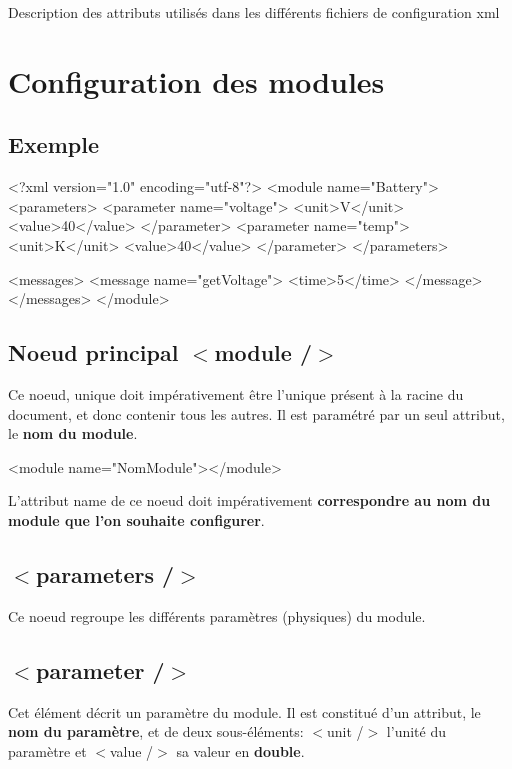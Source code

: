 Description des attributs utilisés dans les différents fichiers de configuration xml\hypertarget{xmlRef_xml_mod}{}\section{Configuration des modules}\label{xmlRef_xml_mod}
\hypertarget{xmlRef_xml_mod_exemple}{}\subsection{Exemple}\label{xmlRef_xml_mod_exemple}

\begin{DoxyCode}
<?xml version=\textcolor{stringliteral}{"1.0"} encoding=\textcolor{stringliteral}{"utf-8"}?>
<module name=\textcolor{stringliteral}{"Battery"}>
    <parameters>
        <parameter name=\textcolor{stringliteral}{"voltage"}>
            <unit>V</unit>
            <value>40</value>
        </parameter>
        <parameter name=\textcolor{stringliteral}{"temp"}>
            <unit>K</unit>
            <value>40</value>
        </parameter>
    </parameters>

    <messages>
        <message name=\textcolor{stringliteral}{"getVoltage"}>
            <time>5</time>
        </message>
    </messages>
</module>
\end{DoxyCode}
\hypertarget{xmlRef_xml_mod_mod}{}\subsection{Noeud principal $<$module /$>$}\label{xmlRef_xml_mod_mod}
Ce noeud, unique doit impérativement être l'unique présent à la racine du document, et donc contenir tous les autres. Il est paramétré par un seul attribut, le {\bfseries nom du module}.


\begin{DoxyCode}
<module name=\textcolor{stringliteral}{"NomModule"}></module> 
\end{DoxyCode}


L'attribut name de ce noeud doit impérativement {\bfseries correspondre au nom du module que l'on souhaite configurer}.\hypertarget{xmlRef_xml_mod_params}{}\subsection{$<$parameters /$>$}\label{xmlRef_xml_mod_params}
Ce noeud regroupe les différents paramètres (physiques) du module.\hypertarget{xmlRef_xml_mod_param}{}\subsection{$<$parameter /$>$}\label{xmlRef_xml_mod_param}
Cet élément décrit un paramètre du module. Il est constitué d'un attribut, le {\bfseries nom du paramètre}, et de deux sous-\/éléments\-: {\ttfamily $<$unit /$>$} l'unité du paramètre et {\ttfamily $<$value /$>$} sa valeur en {\bfseries double}.


